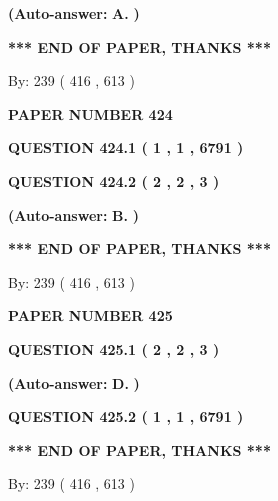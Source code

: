 \documentclass[12pt]{article}
\begin{document}
 
{\textbf{(Auto-answer:}}
{\textbf{\large{
A.}}}
{\textbf{)}}
 
 
   
   
   
   
\vspace{1.0in} 
{\textbf{\large{ *** END OF PAPER, THANKS *** }}} 
   
   
\hspace{1.0in} By: 
 239 ( 416 ,  613 )
   
   
   
   
\newpage 
\setcounter{page}{ 
   424001 } 
   
   
 {\textbf{ \Large{ PAPER NUMBER  424  }}}
   
   
   
   
  
  
{\textbf{\large{QUESTION
424.1 
 ( 1 , 1 , 6791 )
}}}
  
  
{\textbf{\large{QUESTION
424.2 
 ( 2 , 2 , 3 )
}}}
 
 
{\textbf{(Auto-answer:}}
{\textbf{\large{
B.}}}
{\textbf{)}}
 
 
   
   
   
   
\vspace{1.0in} 
{\textbf{\large{ *** END OF PAPER, THANKS *** }}} 
   
   
\hspace{1.0in} By: 
 239 ( 416 ,  613 )
   
   
   
   
\newpage 
\setcounter{page}{ 
   425001 } 
   
   
 {\textbf{ \Large{ PAPER NUMBER  425  }}}
   
   
   
   
  
  
{\textbf{\large{QUESTION
425.1 
 ( 2 , 2 , 3 )
}}}
 
 
{\textbf{(Auto-answer:}}
{\textbf{\large{
D.}}}
{\textbf{)}}
 
 
  
  
{\textbf{\large{QUESTION
425.2 
 ( 1 , 1 , 6791 )
}}}
   
   
   
   
\vspace{1.0in} 
{\textbf{\large{ *** END OF PAPER, THANKS *** }}} 
   
   
\hspace{1.0in} By: 
 239 ( 416 ,  613 )
   
   
   
   
\newpage 
\setcounter{page}{ 
   426001 } 
   
\end{document}

